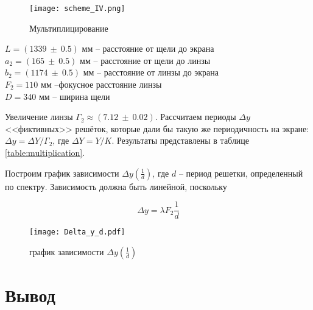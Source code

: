     
    
    \begin{figure}[h!]
    	\centering
    	\texttt{[image: scheme\_IV.png]}
    	\caption{Мультиплицирование}
    \end{figure}

	\begin{center}
		$L = (1339 ~ \pm ~ 0.5)$ мм -- расстояние от щели до экрана \\
		$a_2 = (165 ~ \pm ~ 0.5)$ мм -- расстояние от щели до линзы \\
		$b_2 = (1174 ~ \pm ~ 0.5)$ мм -- расстояние от линзы до экрана \\
		$F_2 = 110$ мм --фокусное расстояние линзы \\
		$D = 340$ мм -- ширина щели
	\end{center}

	Увеличение линзы $\Gamma_2 \approx (7.12 ~ \pm ~ 0.02)$. Рассчитаем периоды $\Delta y$ <<фиктивных>> решёток, которые дали бы такую же периодичность на экране: $\Delta y=\Delta Y / \Gamma_{2}$, где $\Delta Y=Y / K .$ Результаты представлены в таблице \ref{table:multiplication}.
	
	Построим график зависимости $\Delta y(\frac{1}{d})$, где $d$ -- период решетки, определенный по спектру. Зависимость должна быть линейной, поскольку
	
	\begin{equation}
		\Delta y = \lambda F_2 \frac{1}{d}
	\end{equation} 
	
	
	
	\begin{figure}[h!]
		\centering
		\texttt{[image: Delta\_y\_d.pdf]}
		\caption{график зависимости $\Delta y(\frac{1}{d})$}
	\end{figure}

	\section{Вывод}

    
